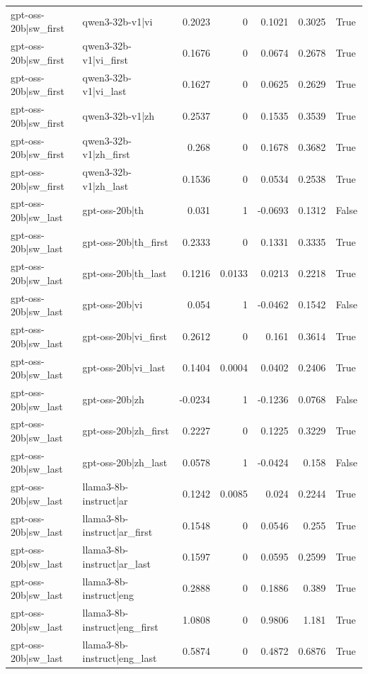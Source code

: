 \begin{table}
\begin{tabular}{l l r r r r l}
gpt-oss-20b|sw_first & qwen3-32b-v1|vi & 0.2023 & 0 & 0.1021 & 0.3025 & True \\
gpt-oss-20b|sw_first & qwen3-32b-v1|vi_first & 0.1676 & 0 & 0.0674 & 0.2678 & True \\
gpt-oss-20b|sw_first & qwen3-32b-v1|vi_last & 0.1627 & 0 & 0.0625 & 0.2629 & True \\
gpt-oss-20b|sw_first & qwen3-32b-v1|zh & 0.2537 & 0 & 0.1535 & 0.3539 & True \\
gpt-oss-20b|sw_first & qwen3-32b-v1|zh_first & 0.268 & 0 & 0.1678 & 0.3682 & True \\
gpt-oss-20b|sw_first & qwen3-32b-v1|zh_last & 0.1536 & 0 & 0.0534 & 0.2538 & True \\
gpt-oss-20b|sw_last & gpt-oss-20b|th & 0.031 & 1 & -0.0693 & 0.1312 & False \\
gpt-oss-20b|sw_last & gpt-oss-20b|th_first & 0.2333 & 0 & 0.1331 & 0.3335 & True \\
gpt-oss-20b|sw_last & gpt-oss-20b|th_last & 0.1216 & 0.0133 & 0.0213 & 0.2218 & True \\
gpt-oss-20b|sw_last & gpt-oss-20b|vi & 0.054 & 1 & -0.0462 & 0.1542 & False \\
gpt-oss-20b|sw_last & gpt-oss-20b|vi_first & 0.2612 & 0 & 0.161 & 0.3614 & True \\
gpt-oss-20b|sw_last & gpt-oss-20b|vi_last & 0.1404 & 0.0004 & 0.0402 & 0.2406 & True \\
gpt-oss-20b|sw_last & gpt-oss-20b|zh & -0.0234 & 1 & -0.1236 & 0.0768 & False \\
gpt-oss-20b|sw_last & gpt-oss-20b|zh_first & 0.2227 & 0 & 0.1225 & 0.3229 & True \\
gpt-oss-20b|sw_last & gpt-oss-20b|zh_last & 0.0578 & 1 & -0.0424 & 0.158 & False \\
gpt-oss-20b|sw_last & llama3-8b-instruct|ar & 0.1242 & 0.0085 & 0.024 & 0.2244 & True \\
gpt-oss-20b|sw_last & llama3-8b-instruct|ar_first & 0.1548 & 0 & 0.0546 & 0.255 & True \\
gpt-oss-20b|sw_last & llama3-8b-instruct|ar_last & 0.1597 & 0 & 0.0595 & 0.2599 & True \\
gpt-oss-20b|sw_last & llama3-8b-instruct|eng & 0.2888 & 0 & 0.1886 & 0.389 & True \\
gpt-oss-20b|sw_last & llama3-8b-instruct|eng_first & 1.0808 & 0 & 0.9806 & 1.181 & True \\
gpt-oss-20b|sw_last & llama3-8b-instruct|eng_last & 0.5874 & 0 & 0.4872 & 0.6876 & True \\

\end{tabular}
\end{table}
